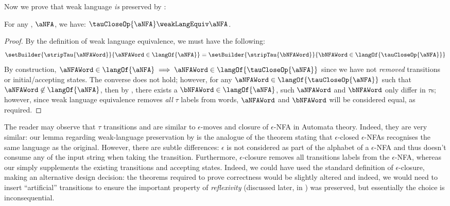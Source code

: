 Now we prove that weak language \emph{is} preserved by \tauClosure{}:

\begin{lemma}
    For any \TNFA{}, $\aNFA$, we have: $\tauCloseOp{\aNFA} \weakLangEquiv
    \aNFA$.
\end{lemma}
\begin{proof}
By the definition of weak language equivalence, we must have the following:
\[
    \setBuilder{\stripTau{\aNFAWord}}{\aNFAWord \in \langOf{\aNFA}}
    =
    \setBuilder{\stripTau{\bNFAWord}}{\bNFAWord \in \langOf{\tauCloseOp{\aNFA}}}
\]
By construction, $\aNFAWord \in \langOf{\aNFA} \implies \aNFAWord \in
\langOf{\tauCloseOp{\aNFA}}$ since we have not \emph{removed} transitions or
initial/accepting states. The converse does not hold; however, for any
$\aNFAWord \in \langOf{\tauCloseOp{\aNFA}}$ such that $\aNFAWord \not\in
\langOf{\aNFA}$, then by , there exists a $\bNFAWord \in
\langOf{\aNFA}$, such $\aNFAWord$ and $\bNFAWord$ only differ in $\tau$s;
however, since weak language equivalence removes \emph{all} $\tau$ labels from
words, $\aNFAWord$ and $\bNFAWord$ will be considered equal, as required.
\end{proof}

\begin{remark}\label{rem:tautrans}
The reader may observe that $\tau$ transitions and \tauClosure{} are similar to
$\epsilon$-moves and closure of $\epsilon$-NFA in Automata theory. Indeed, they
are very similar: our lemma regarding weak-language preservation by
\tauClosure{} is the analogue of the theorem stating that $\epsilon$-closed
$\epsilon$-NFAs recognises the same language as the original. However, there
are subtle differences: $\epsilon$ is not considered as part of the alphabet of
a $\epsilon$-NFA and thus doesn't consume any of the input string when taking
the transition. Furthermore, $\epsilon$-closure removes all transitions labels
from the $\epsilon$-NFA, whereas our \tauClosure{} simply supplements the
existing transitions and accepting states. Indeed, we could have used the
standard definition of $\epsilon$-closure, making an alternative design
decision: the theorems required to prove correctness would be slightly altered
and indeed, we would need to insert ``artificial'' transitions to ensure the
important property of \emph{reflexivity} (discussed later, in
) was preserved, but essentially the choice is
inconsequential.
\end{remark}

